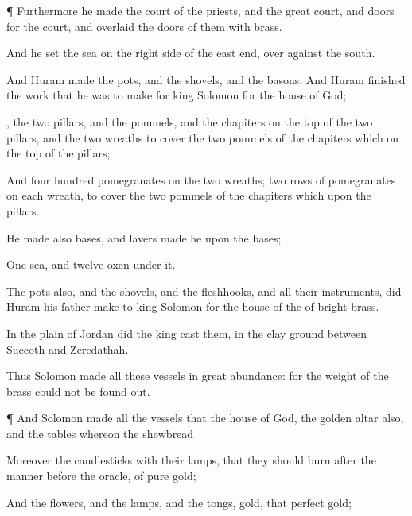 {\par }{\PP {}¶ Furthermore he
made the
court of the
priests, and the
great
court, and
doors for the
court, and
overlaid the
doors of them with
brass.

And he
set the
sea on the
right
side of the east
end, over
against the
south.


\par }{\PP {}And
Huram
made the
pots, and the
shovels, and the
basons. And
Huram
finished the
work that he was to
make for
king
Solomon for the
house of
God;

, the
two
pillars, and the
pommels, and the
chapiters
{} on the
top of the two
pillars, and the
two
wreaths to
cover the
two
pommels of the
chapiters which
{} on the
top of the
pillars;

And
four
hundred
pomegranates on the
two
wreaths;
two
rows of
pomegranates on
each
wreath, to
cover the
two
pommels of the
chapiters which
{}
upon the
pillars.

He
made also
bases, and
lavers
made he upon the
bases;

One
sea, and
twelve
oxen under it.

The
pots also, and the
shovels, and the
fleshhooks, and all their
instruments, did
Huram his
father
make to
king
Solomon for the
house of the
{} of
bright
brass.

In the
plain of
Jordan did the
king
cast them, in the
clay
ground between
Succoth and
Zeredathah.

Thus
Solomon
made all these
vessels in
great
abundance: for the
weight of the
brass could not be found
out.


\par }{\PP {}¶ And
Solomon
made all the
vessels that
{} the
house of
God, the
golden
altar also, and the
tables whereon the
shewbread
{}

Moreover the
candlesticks with their
lamps, that they should
burn after the
manner
before the
oracle, of
pure
gold;

And the
flowers, and the
lamps, and the
tongs,
{}
gold,
{} that
perfect
gold;

}
